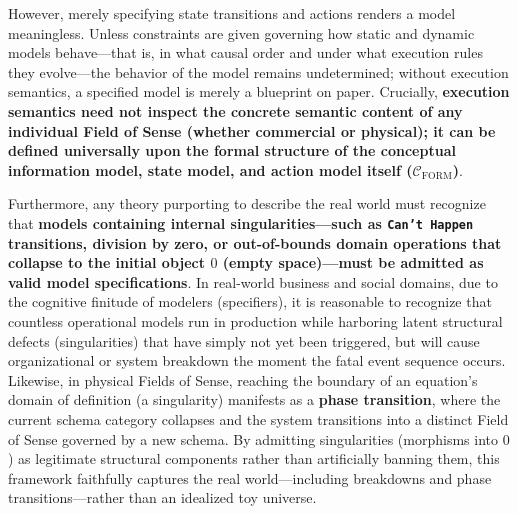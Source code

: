 \documentclass[11pt,a4paper]{article}
\theoremstyle{definition}
\theoremstyle{plain}
\theoremstyle{remark}
\newcommand{\Cform}{\mathcal{C}_{\mathrm{FORM}}}
\begin{document}
However, merely specifying state transitions and actions renders a model meaningless. Unless constraints are given governing how static and dynamic models behave---that is, in what causal order and under what execution rules they evolve---the behavior of the model remains undetermined; without execution semantics, a specified model is merely a blueprint on paper. Crucially, \textbf{execution semantics need not inspect the concrete semantic content of any individual Field of Sense (whether commercial or physical); it can be defined universally upon the formal structure of the conceptual information model, state model, and action model itself ($\Cform$)}.

Furthermore, any theory purporting to describe the real world must recognize that \textbf{models containing internal singularities---such as \texttt{Can't Happen} transitions, division by zero, or out-of-bounds domain operations that collapse to the initial object $0$ (empty space)---must be admitted as valid model specifications}. In real-world business and social domains, due to the cognitive finitude of modelers (specifiers), it is reasonable to recognize that countless operational models run in production while harboring latent structural defects (singularities) that have simply not yet been triggered, but will cause organizational or system breakdown the moment the fatal event sequence occurs. Likewise, in physical Fields of Sense, reaching the boundary of an equation's domain of definition (a singularity) manifests as a \textbf{phase transition}, where the current schema category collapses and the system transitions into a distinct Field of Sense governed by a new schema. By admitting singularities (morphisms into $0$) as legitimate structural components rather than artificially banning them, this framework faithfully captures the real world---including breakdowns and phase transitions---rather than an idealized toy universe.
\end{document}
